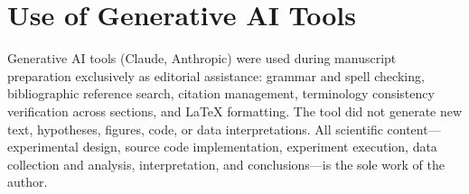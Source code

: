 \documentclass[conference]{IEEEtran}
\begin{document}
\section*{Use of Generative AI Tools}

Generative AI tools (Claude, Anthropic) were used during manuscript
preparation exclusively as editorial assistance: grammar and spell
checking, bibliographic reference search, citation management,
terminology consistency verification across sections, and \LaTeX{}
formatting.
The tool did not generate new text, hypotheses, figures, code, or
data interpretations.
All scientific content---experimental design, source code
implementation, experiment execution, data collection and analysis,
interpretation, and conclusions---is the sole work of the author.



\end{document}
